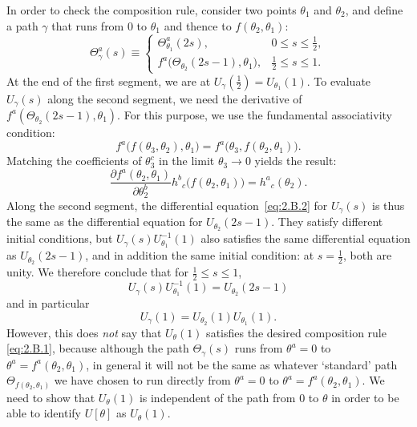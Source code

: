 In order to check the composition rule, consider two points $\theta_1$ and
$\theta_2$, and define a path $\gamma$ that runs from 0 to $\theta_1$
and thence to $f(\theta_2,\theta_1)$:
\begin{equation}
  \Theta^a_{\gamma}(s)\equiv
  \begin{cases}
    \Theta^a_{\theta_1}(2s),
      &0\leq s\leq \tfrac12,\\
    f^a\bigl(\Theta_{\theta_2}(2s-1),\theta_1\bigr),
      &\tfrac12\leq s\leq 1.
  \end{cases}
  \tag{2.B.5}\label{eq:2.B.5}
\end{equation}
At the end of the first segment, we are at
$U_{\gamma}(\tfrac12)=U_{\theta_1}(1)$. To evaluate
$U_{\gamma}(s)$ along the second segment, we need the derivative of
$f^a(\Theta_{\theta_2}(2s-1),\theta_1)$. For this purpose, we use the
fundamental associativity condition:
\begin{equation}
  f^a\bigl(f(\theta_3,\theta_2),\theta_1\bigr)
    =f^a\bigl(\theta_3,f(\theta_2,\theta_1)\bigr).
  \tag{2.B.6}\label{eq:2.B.6}
\end{equation}
Matching the coefficients of $\theta_3^c$ in the limit $\theta_3\to0$
yields the result:
\begin{equation}
  \frac{\partial f^a(\theta_2,\theta_1)}{\partial\theta_2^b}
    h^b{}_{c}\bigl(f(\theta_2,\theta_1)\bigr)
    =h^a{}_{c}(\theta_2).
  \tag{2.B.7}\label{eq:2.B.7}
\end{equation}
Along the second segment, the differential equation~\eqref{eq:2.B.2} for
$U_{\gamma}(s)$ is thus the same as the differential equation for
$U_{\theta_2}(2s-1)$. They satisfy different initial conditions, but
$U_{\gamma}(s)U^{-1}_{\theta_1}(1)$ also satisfies the same differential
equation as $U_{\theta_2}(2s-1)$, and in addition the same initial
condition: at $s=\tfrac12$, both are unity. We therefore conclude that for
$\tfrac12\leq s\leq1$,
\begin{equation*}
  U_{\gamma}(s)U^{-1}_{\theta_1}(1)=U_{\theta_2}(2s-1)
\end{equation*}
and in particular
\begin{equation}
  U_{\gamma}(1)=U_{\theta_2}(1)U_{\theta_1}(1).
  \tag{2.B.8}\label{eq:2.B.8}
\end{equation}
However, this does \emph{not} say that $U_{\theta}(1)$ satisfies the desired
composition rule \eqref{eq:2.B.1}, because although the path
$\Theta_{\gamma}(s)$ runs from $\theta^a=0$ to
$\theta^a=f^a(\theta_2,\theta_1)$, in general it will not be the same as
whatever `standard' path $\Theta_{f(\theta_2,\theta_1)}$ we have chosen to
run directly from $\theta^a=0$ to
$\theta^a=f^a(\theta_2,\theta_1)$. We need to show that $U_{\theta}(1)$ is
independent of the path from 0 to $\theta$ in order to be able to identify
$U[\theta]$ as $U_{\theta}(1)$.

